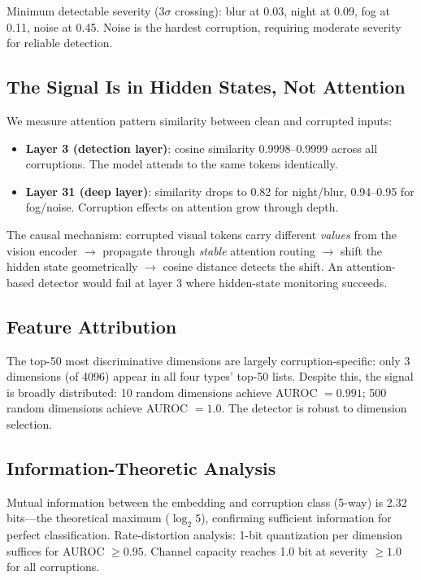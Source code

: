 \documentclass[11pt]{article}
\begin{document}
Minimum detectable severity ($3\sigma$ crossing): blur at 0.03, night at 0.09, fog at 0.11, noise at 0.45.
Noise is the hardest corruption, requiring moderate severity for reliable detection.

\subsection{The Signal Is in Hidden States, Not Attention}

We measure attention pattern similarity between clean and corrupted inputs:
\begin{itemize}
    \item \textbf{Layer 3 (detection layer)}: cosine similarity 0.9998--0.9999 across all corruptions. The model attends to the same tokens identically.
    \item \textbf{Layer 31 (deep layer)}: similarity drops to 0.82 for night/blur, 0.94--0.95 for fog/noise. Corruption effects on attention grow through depth.
\end{itemize}

The causal mechanism: corrupted visual tokens carry different \emph{values} from the vision encoder $\to$ propagate through \emph{stable} attention routing $\to$ shift the hidden state geometrically $\to$ cosine distance detects the shift.
An attention-based detector would fail at layer 3 where hidden-state monitoring succeeds.

\subsection{Feature Attribution}

The top-50 most discriminative dimensions are largely corruption-specific: only 3 dimensions (of 4096) appear in all four types' top-50 lists.
Despite this, the signal is broadly distributed:
10 random dimensions achieve AUROC $= 0.991$; 500 random dimensions achieve AUROC $= 1.0$.
The detector is robust to dimension selection.

\subsection{Information-Theoretic Analysis}

Mutual information between the embedding and corruption class (5-way) is 2.32 bits---the theoretical maximum ($\log_2 5$), confirming sufficient information for perfect classification.
Rate-distortion analysis: 1-bit quantization per dimension suffices for AUROC $\geq 0.95$.
Channel capacity reaches 1.0 bit at severity $\geq 1.0$ for all corruptions.
\end{document}
